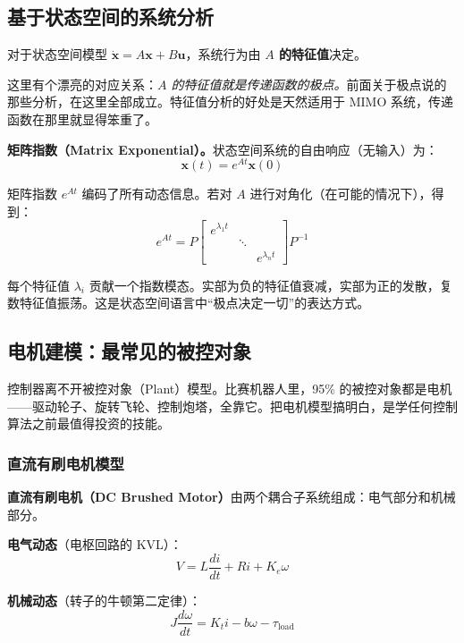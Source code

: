 \subsection{基于状态空间的系统分析}

对于状态空间模型 $\dot{\mathbf{x}} = A\mathbf{x} + B\mathbf{u}$，系统行为由 \textbf{$A$ 的特征值}决定。

这里有个漂亮的对应关系：\textit{$A$ 的特征值就是传递函数的极点。}前面关于极点说的那些分析，在这里全部成立。特征值分析的好处是天然适用于 MIMO 系统，传递函数在那里就显得笨重了。

\textbf{矩阵指数（Matrix Exponential）。}状态空间系统的自由响应（无输入）为：
\begin{equation}
\mathbf{x}(t) = e^{At}\mathbf{x}(0)
\end{equation}

矩阵指数 $e^{At}$ 编码了所有动态信息。若对 $A$ 进行对角化（在可能的情况下），得到：
\begin{equation}
e^{At} = P \begin{bmatrix} e^{\lambda_1 t} & & \\ & \ddots & \\ & & e^{\lambda_n t} \end{bmatrix} P^{-1}
\end{equation}

每个特征值 $\lambda_i$ 贡献一个指数模态。实部为负的特征值衰减，实部为正的发散，复数特征值振荡。这是状态空间语言中``极点决定一切''的表达方式。

\subsection{电机建模：最常见的被控对象}

控制器离不开被控对象（Plant）模型。比赛机器人里，95\% 的被控对象都是电机——驱动轮子、旋转飞轮、控制炮塔，全靠它。把电机模型搞明白，是学任何控制算法之前最值得投资的技能。

\subsubsection*{直流有刷电机模型}

\textbf{直流有刷电机（DC Brushed Motor）}由两个耦合子系统组成：电气部分和机械部分。

\textbf{电气动态}（电枢回路的 KVL）：
\begin{equation}
V = L\frac{di}{dt} + Ri + K_e\omega
\end{equation}

\textbf{机械动态}（转子的牛顿第二定律）：
\begin{equation}
J\frac{d\omega}{dt} = K_t i - b\omega - \tau_{\text{load}}
\end{equation}

